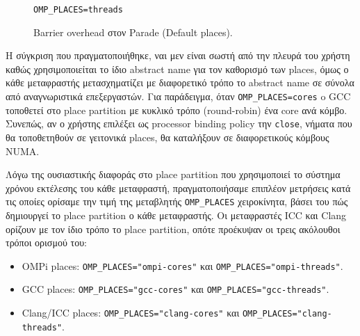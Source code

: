 \begin{figure}
\begin{minipage}{0.5\textwidth}
        \texttt{OMP\_PLACES=threads}
    \end{minipage}
    \caption{Barrier overhead στον Parade (Default places).}
    \label{fig:bo-parade-default-places}
\end{figure}


Η σύγκριση που πραγματοποιήθηκε, ναι μεν είναι σωστή από την πλευρά του χρήστη καθώς χρησιμοποιείται το ίδιο abstract name για τον καθορισμό των places, όμως ο κάθε μεταφραστής μετασχηματίζει με διαφορετικό τρόπο το abstract name σε σύνολα από αναγνωριστικά επεξεργαστών. Για παράδειγμα, όταν \texttt{OMP\_PLACES=cores} o GCC τοποθετεί στο place partition με κυκλικό τρόπο (round-robin) ένα core ανά κόμβο. Συνεπώς, αν ο χρήστης επιλέξει ως processor binding policy την \texttt{close}, νήματα που θα τοποθετηθούν σε γειτονικά places, θα καταλήξουν σε διαφορετικούς κόμβους NUMA.

Λόγω της ουσιαστικής διαφοράς στο place partition που χρησιμοποιεί το σύστημα χρόνου εκτέλεσης του κάθε μεταφραστή, πραγματοποιήσαμε επιπλέον μετρήσεις κατά τις οποίες ορίσαμε την τιμή της μεταβλητής \texttt{OMP\_PLACES} χειροκίνητα, βάσει του πώς δημιουργεί το place partition ο κάθε μεταφραστής. Οι μεταφραστές ICC και Clang ορίζουν με τον ίδιο τρόπο το place partition, οπότε προέκυψαν οι τρεις ακόλουθοι τρόποι ορισμού του:
\begin{itemize}
	\item OMPi places: \texttt{OMP\_PLACES="ompi-cores"} και \texttt{OMP\_PLACES="ompi-threads"}.
	\item GCC places: \texttt{OMP\_PLACES="gcc-cores"} και \texttt{OMP\_PLACES="gcc-threads"}.
	\item Clang/ICC places: \texttt{OMP\_PLACES="clang-cores"} και \texttt{OMP\_PLACES="clang-threads"}.
\end{itemize}


